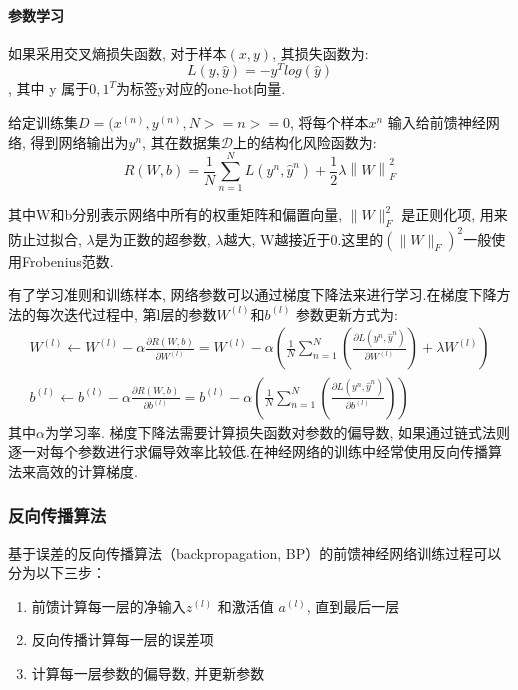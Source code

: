 \documentclass[a4paper]{article}
\theoremstyle{definition}
\numberwithin{equation}{section}
\begin{document}
\paragraph{参数学习}
如果采用交叉熵损失函数, 对于样本$(x, y)$, 其损失函数为:
$$L(y, \hat{y}) = -y^T log (\hat{y})$$, 
其中 y 属于${0, 1}^T$为标签y对应的one-hot向量.

给定训练集$D={(x^{(n)}, y^{(n)},  N>=n>=0}$, 将每个样本$x^n$ 输入给前馈神经网络, 得到网络输出为$y^n$, 其在数据集$\mathcal{D}$上的结构化风险函数为:
$$R(W, b)=\frac{1}{N}\sum_{n=1}^{N} L(y^n, \hat{y}^n) + \frac{1}{2}\lambda \left \| W \right \|_F^2$$
 
其中W和b分别表示网络中所有的权重矩阵和偏置向量,  $\|W\|_F^2$ 是正则化项, 用来防止过拟合, $\lambda$是为正数的超参数, $\lambda$越大, W越接近于0.这里的$(\|W\|_F)^2$一般使用Frobenius范数.
 
有了学习准则和训练样本, 网络参数可以通过梯度下降法来进行学习.在梯度下降方法的每次迭代过程中, 第l层的参数$ W^{(l)} $和$ b^{(l)}$ 参数更新方式为:
\begin{gather*}
    W^{(l)} \leftarrow W^{(l)} - \alpha \frac{\partial R(W, b)}{\partial W^{(l)}}=W^{(l)} - \alpha ( \frac{1}{N} \sum_{n=1}^{N}(\frac{\partial L(y^n, \hat{y}^n)}{\partial W^{(l)}}) + \lambda W^{(l)} )\\b^{(l)} \leftarrow b^{(l)} - \alpha \frac{\partial R(W, b)}{\partial b^{(l)}}=b^{(l)} - \alpha ( \frac{1}{N} \sum_{n=1}^{N}(\frac{\partial L(y^n, \hat{y}^n)}{\partial b^{(l)}}) ) 
\end{gather*}
其中$\alpha$为学习率.
梯度下降法需要计算损失函数对参数的偏导数, 如果通过链式法则逐一对每个参数进行求偏导效率比较低.在神经网络的训练中经常使用反向传播算法来高效的计算梯度. 
\subsubsection{反向传播算法}
基于误差的反向传播算法（backpropagation, BP）的前馈神经网络训练过程可以分为以下三步：
\begin{enumerate} 
    \renewcommand{\labelenumi}{(\theenumi)}
\item 前馈计算每一层的净输入$z^{(l)}$ 和激活值 $a^{(l)}$, 直到最后一层
\item 反向传播计算每一层的误差项
\item 计算每一层参数的偏导数, 并更新参数
\end{enumerate}
\end{document}
